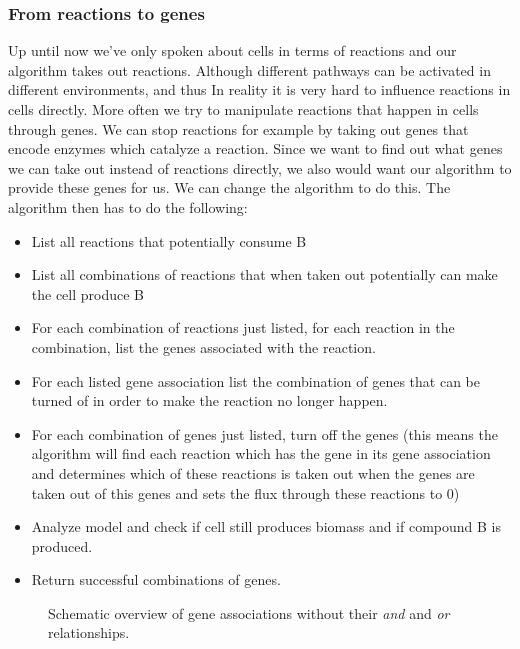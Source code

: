 \documentclass[12pt]{report}
\begin{document}
\subsubsection{From reactions to genes}
Up until now we've only spoken about cells in terms of reactions and our algorithm takes out reactions. Although different pathways can be activated in different environments, and thus  In reality it is very hard to influence reactions in cells directly.
More often we try to manipulate reactions that happen in cells through genes.
We can stop reactions for example by taking out genes that encode enzymes which catalyze a reaction.
Since we want to find out what genes we can take out instead of reactions directly, we also would want our algorithm to provide these genes for us.
We can change the algorithm to do this.
The algorithm then has to do the following:
\begin{itemize}
\item List all reactions that potentially consume B
\item List all combinations of reactions that when taken out potentially can make the cell produce B
\item For each combination of reactions just listed, for each reaction in the combination, list the genes associated with the reaction.
\item For each listed gene association list the combination of genes that can be turned of in order to make the reaction no longer happen.
\item For each combination of genes just listed, turn off the genes (this means the algorithm will find each reaction which has the gene in its gene association and determines which of these reactions is taken out when the genes are taken out of this genes and sets the flux through these reactions to 0)
\item Analyze model and check if cell still produces biomass and if compound B is produced.
\item Return successful combinations of genes.
\end{itemize}

\begin{figure}[hbtp]
  \centering
     
      \caption{Schematic overview of gene associations without their \emph{and} and \emph{or} relationships.}
  \label{fig:genes2}
\end{figure}
\end{document}
